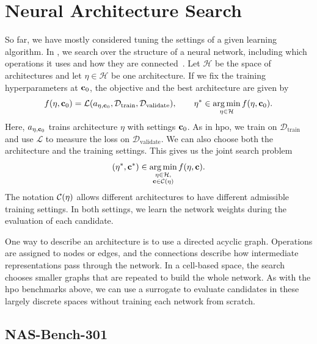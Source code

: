 \section{Neural Architecture Search}
\label{sec:ch03:nas}

So far, we have mostly considered tuning the settings of a given learning algorithm. In , we search over the structure of a neural network, including which operations it uses and how they are connected~\citep{ElsEtAl19}. Let $\mathcal H$ be the space of architectures and let $\eta\in\mathcal H$ be one architecture. If we fix the training hyperparameters at $\mathbf{c}_0$, the objective and the best architecture are given by
\begin{equation*}
    f(\eta,\mathbf{c}_0) =
    \mathcal L(a_{\eta,\mathbf{c}_0},
    \mathcal D_{\mathrm{train}},\mathcal D_{\mathrm{validate}}),
    \qquad
    \eta^*\in\operatorname*{arg\,min}_{\eta\in\mathcal H} f(\eta,\mathbf{c}_0).
\end{equation*}
Here, $a_{\eta,\mathbf{c}_0}$ trains architecture $\eta$ with settings $\mathbf{c}_0$. As in \gls{hpo}, we train on $\mathcal D_{\mathrm{train}}$ and use $\mathcal L$ to measure the loss on $\mathcal D_{\mathrm{validate}}$. We can also choose both the architecture and the training settings. This gives us the joint search problem
\begin{equation*}
    (\eta^*,\mathbf{c}^*)\in
    \operatorname*{arg\,min}_{\substack{\eta\in\mathcal H,\\
    \mathbf{c}\in\mathcal{C}(\eta)}}
    f(\eta,\mathbf{c}).
\end{equation*}
The notation $\mathcal{C}(\eta)$ allows different architectures to have different admissible training settings. In both settings, we learn the network weights during the evaluation of each candidate.

One way to describe an architecture is to use a directed acyclic graph. Operations are assigned to nodes or edges, and the connections describe how intermediate representations pass through the network. In a cell-based space, the search chooses smaller graphs that are repeated to build the whole network. As with the \gls{hpo} benchmarks above, we can use a surrogate to evaluate candidates in these largely discrete spaces without training each network from scratch.

\subsection{NAS-Bench-301}
\label{sec:ch03:nas_bench301}


